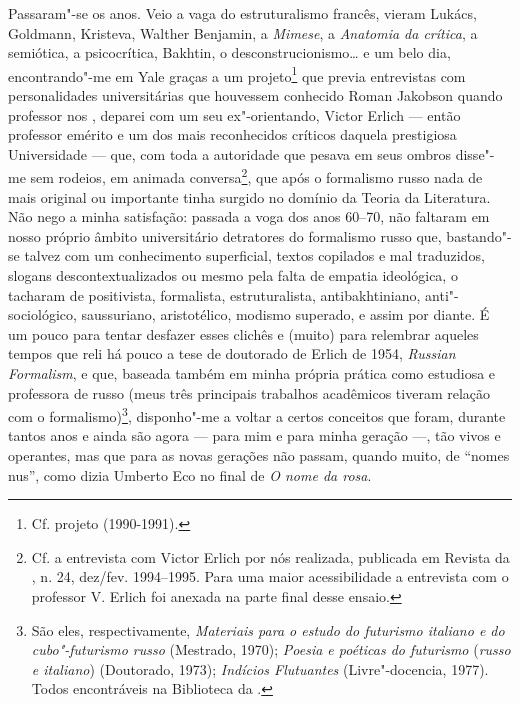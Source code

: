 Passaram"-se os anos. Veio a vaga do estruturalismo francês, vieram
Lukács, Goldmann, Kristeva, Walther Benjamin, a \emph{Mimese}, a
\emph{Anatomia da crítica}, a semiótica, a psicocrítica, Bakhtin, o
desconstrucionismo\ldots{} e um belo dia, encontrando"-me em Yale graças a um
projeto\footnote{Cf. projeto  (1990-1991).} que previa
entrevistas com personalidades universitárias que houvessem conhecido
Roman Jakobson quando professor nos , deparei com um seu
ex"-orientando, Victor Erlich --- então professor emérito e um dos mais
reconhecidos críticos daquela prestigiosa Universidade --- que, com toda
a autoridade que pesava em seus ombros disse"-me sem rodeios, em animada
conversa\footnote{Cf. a entrevista com Victor Erlich por nós realizada,
  publicada em Revista da , n. 24, dez/fev. 1994--1995. Para uma maior
  acessibilidade a entrevista com o professor V. Erlich foi anexada na
  parte final desse ensaio.}, que após o formalismo russo nada de mais
original ou importante tinha surgido no domínio da Teoria da Literatura.
Não nego a minha satisfação: passada a voga dos anos 60--70, não faltaram
em nosso próprio âmbito universitário detratores do formalismo russo
que, bastando"-se talvez com um conhecimento superficial, textos
copilados e mal traduzidos, slogans descontextualizados ou mesmo pela
falta de empatia ideológica, o tacharam de positivista, formalista,
estruturalista, antibakhtiniano, anti"-sociológico, saussuriano,
aristotélico, modismo superado, e assim por diante. É um pouco para
tentar desfazer esses clichês e (muito) para relembrar aqueles tempos
que reli há pouco a tese de doutorado de Erlich de 1954, \emph{Russian
Formalism}, e que, baseada também em minha própria prática como
estudiosa e professora de russo (meus três principais trabalhos
acadêmicos tiveram relação com o formalismo)\footnote{São eles,
  respectivamente, \emph{Materiais para o estudo do futurismo italiano e
  do cubo"-futurismo russo} (Mestrado, 1970); \emph{Poesia e poéticas do
  futurismo} (\emph{russo e italiano}) (Doutorado, 1973); \emph{Indícios
  Flutuantes} (Livre"-docencia, 1977). Todos encontráveis na Biblioteca
  da .}, disponho"-me a voltar a certos conceitos que foram, durante
tantos anos e ainda são agora --- para mim e para minha geração ---, tão
vivos e operantes, mas que para as novas gerações não passam, quando
muito, de ``nomes nus'', como dizia Umberto Eco no final de \emph{O nome
da rosa}.

